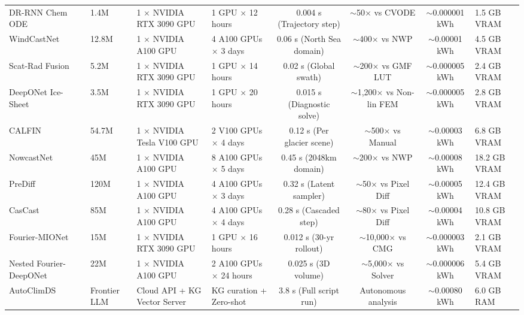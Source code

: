 \begin{table}[t]
{\begin{tabular}{@{}llp{2.6cm}p{3.2cm}cccp{2.6cm}@{}}
DR-RNN Chem ODE~\cite{liu2025atmospheric} & 1.4M & 1 $\times$ NVIDIA RTX 3090 GPU & 1 GPU $\times$ 12 hours & 0.004 s (Trajectory step) & $\sim$50$\times$ vs CVODE & $\sim$0.000001 kWh & 1.5 GB VRAM \\
WindCastNet~\cite{pinto2026windcastnet} & 12.8M & 1 $\times$ NVIDIA A100 GPU & 4 A100 GPUs $\times$ 3 days & 0.06 s (North Sea domain) & $\sim$400$\times$ vs NWP & $\sim$0.00001 kWh & 4.5 GB VRAM \\
Scat-Rad Fusion~\cite{xiang2024scatterometer} & 5.2M & 1 $\times$ NVIDIA RTX 3090 GPU & 1 GPU $\times$ 14 hours & 0.02 s (Global swath) & $\sim$200$\times$ vs GMF LUT & $\sim$0.000005 kWh & 2.4 GB VRAM \\
DeepONet Ice-Sheet~\cite{he2023hybrid} & 3.5M & 1 $\times$ NVIDIA RTX 3090 GPU & 1 GPU $\times$ 20 hours & 0.015 s (Diagnostic solve) & $\sim$1,200$\times$ vs Non-lin FEM & $\sim$0.000005 kWh & 2.8 GB VRAM \\
CALFIN~\cite{cheng2021calfin} & 54.7M & 1 $\times$ NVIDIA Tesla V100 GPU & 2 V100 GPUs $\times$ 4 days & 0.12 s (Per glacier scene) & $\sim$500$\times$ vs Manual & $\sim$0.00003 kWh & 6.8 GB VRAM \\
NowcastNet~\cite{zhang2023nowcastnet} & 45M & 1 $\times$ NVIDIA A100 GPU & 8 A100 GPUs $\times$ 5 days & 0.45 s (2048km domain) & $\sim$200$\times$ vs NWP & $\sim$0.00008 kWh & 18.2 GB VRAM \\
PreDiff~\cite{gao2023prediff} & 120M & 1 $\times$ NVIDIA A100 GPU & 4 A100 GPUs $\times$ 3 days & 0.32 s (Latent sampler) & $\sim$50$\times$ vs Pixel Diff & $\sim$0.00005 kWh & 12.4 GB VRAM \\
CasCast~\cite{gong2024cascast} & 85M & 1 $\times$ NVIDIA A100 GPU & 4 A100 GPUs $\times$ 4 days & 0.28 s (Cascaded step) & $\sim$80$\times$ vs Pixel Diff & $\sim$0.00004 kWh & 10.8 GB VRAM \\
Fourier-MIONet~\cite{jiang2024fouriermionet} & 15M & 1 $\times$ NVIDIA RTX 3090 GPU & 1 GPU $\times$ 16 hours & 0.012 s (30-yr rollout) & $\sim$10,000$\times$ vs CMG & $\sim$0.000003 kWh & 2.1 GB VRAM \\
Nested Fourier-DeepONet~\cite{lee2024nested} & 22M & 1 $\times$ NVIDIA A100 GPU & 2 A100 GPUs $\times$ 24 hours & 0.025 s (3D volume) & $\sim$5,000$\times$ vs Solver & $\sim$0.000006 kWh & 5.4 GB VRAM \\
AutoClimDS~\cite{jaber2025autoclimds} & Frontier LLM & Cloud API + KG Vector Server & KG curation + Zero-shot & 3.8 s (Full script run) & Autonomous analysis & $\sim$0.00080 kWh & 6.0 GB RAM \\
\bottomrule
\end{tabular}%
}
\end{table}


